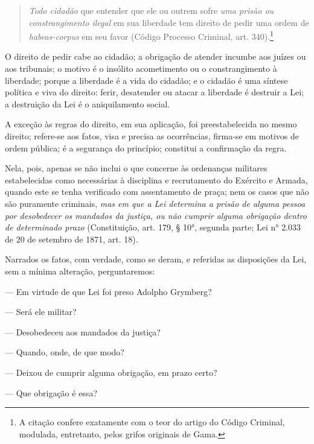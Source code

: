 \begin{quote}
\emph{Todo cidadão} que entender que ele ou outrem sofre \emph{uma
prisão ou constrangimento ilegal} em sua liberdade tem direito de pedir
uma ordem de \emph{habeas-corpus} em seu favor (Código Processo
Criminal, art. 340).\footnote{A citação confere exatamente com o
  teor do artigo do Código Criminal, modulada, entretanto, pelos grifos
  originais de Gama.}
 \end{quote} 

O direito de pedir cabe ao cidadão; a obrigação de atender incumbe aos
juízes ou aos tribunais; o motivo é o insólito acometimento ou o
constrangimento à liberdade; porque a liberdade é a vida do cidadão; e o
cidadão é uma síntese política e viva do direito: ferir, desatender ou
atacar a liberdade é destruir a Lei; a destruição da Lei é o
aniquilamento social.

A exceção às regras do direito, em sua aplicação, foi preestabelecida no
mesmo direito; refere-se aos fatos, visa e precisa as ocorrências,
firma-se em motivos de ordem pública; é a segurança do princípio;
constitui a confirmação da regra.

Nela, pois, apenas se não inclui o que concerne às ordenanças militares
estabelecidas como necessárias à disciplina e recrutamento do Exército e
Armada, quando este se tenha verificado com assentamento de praça; nem
os casos que não são puramente criminais, \emph{mas em que a Lei
determina a prisão de alguma pessoa por desobedecer os mandados da
justiça, ou não cumprir alguma obrigação dentro de determinado prazo}
(Constituição, art. 179, § 10°, segunda parte; Lei n° 2.033 de 20
de setembro de 1871, art. 18).

Narrados os fatos, com verdade, como se deram, e referidas as
disposições da Lei, sem a mínima alteração, perguntaremos:

--- Em virtude de que Lei foi preso Adolpho Grymberg?

--- Será ele militar?

--- Desobedeceu aos mandados da justiça?

--- Quando, onde, de que modo?

--- Deixou de cumprir alguma obrigação, em prazo certo?

--- Que obrigação é essa?

\asterisc

